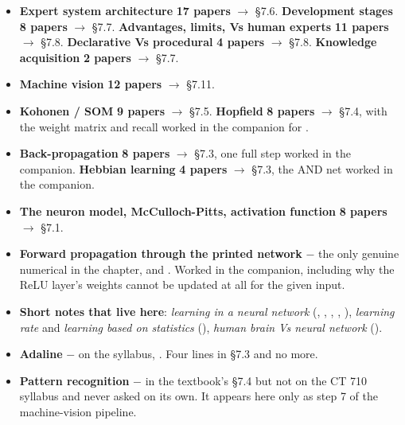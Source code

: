 \begin{itemize}
  \item \textbf{Expert system architecture} \textbf{17 papers} $\rightarrow$ \S7.6.
        \textbf{Development stages} \textbf{8 papers} $\rightarrow$ \S7.7.
        \textbf{Advantages, limits, Vs human experts} \textbf{11 papers} $\rightarrow$
        \S7.8. \textbf{Declarative Vs procedural} \textbf{4 papers} $\rightarrow$ \S7.8.
        \textbf{Knowledge acquisition} \textbf{2 papers} $\rightarrow$ \S7.7.
  \item \textbf{Machine vision} \textbf{12 papers} $\rightarrow$ \S7.11.
  \item \textbf{Kohonen / SOM} \textbf{9 papers} $\rightarrow$ \S7.5.
        \textbf{Hopfield} \textbf{8 papers} $\rightarrow$ \S7.4, with the weight matrix
        and recall worked in the companion for .
  \item \textbf{Back-propagation} \textbf{8 papers} $\rightarrow$ \S7.3, one full step
        worked in the companion. \textbf{Hebbian learning} \textbf{4 papers}
        $\rightarrow$ \S7.3, the AND net worked in the companion.
  \item \textbf{The neuron model, McCulloch-Pitts, activation function}
        \textbf{8 papers} $\rightarrow$ \S7.1.
  \item \textbf{Forward propagation through the printed network} 
         $-$ the only genuine numerical in the
        chapter, and . Worked in the companion, including why the ReLU layer's weights
        cannot be updated at all for the given input.
  \item \textbf{Short notes that live here}: \emph{learning in a neural network}
        (, , , ,
        ), \emph{learning rate} and \emph{learning based on statistics}
        (), \emph{human brain Vs neural network}
        ().
  \item \textbf{Adaline} $-$ on the syllabus, . Four lines in \S7.3 and no more.
  \item \textbf{Pattern recognition} $-$ in the textbook's \S7.4 but not on the CT 710
        syllabus and never asked on its own. It appears here only as step 7 of the
        machine-vision pipeline.
\end{itemize}

